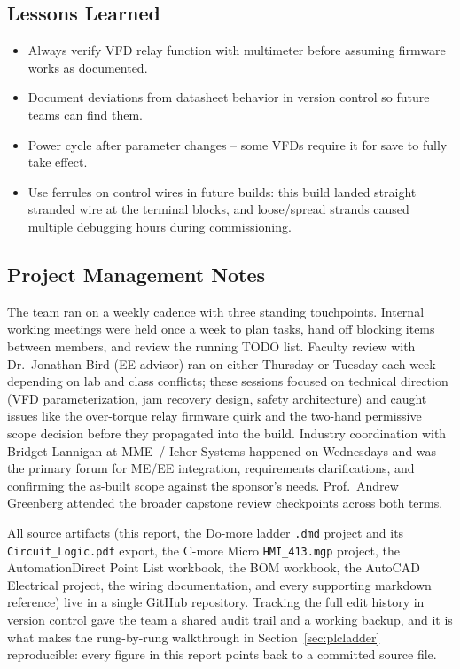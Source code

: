 \documentclass[hidelinks,12pt]{article}
\begin{document}
\subsection{Lessons Learned}
\begin{itemize}
    \item Always verify VFD relay function with multimeter before assuming firmware works as documented.
    \item Document deviations from datasheet behavior in version control so future teams can find them.
    \item Power cycle after parameter changes -- some VFDs require it for save to fully take effect.
    \item Use ferrules on control wires in future builds: this build landed straight stranded wire at the terminal blocks, and loose/spread strands caused multiple debugging hours during commissioning.
\end{itemize}

\subsection{Project Management Notes}

The team ran on a weekly cadence with three standing touchpoints. Internal
working meetings were held once a week to plan tasks, hand off blocking items
between members, and review the running TODO list. Faculty review with
Dr.~Jonathan Bird (EE advisor) ran on either Thursday or Tuesday each week
depending on lab and class conflicts; these sessions focused on technical
direction (VFD parameterization, jam recovery design, safety architecture) and
caught issues like the over-torque relay firmware quirk and the two-hand
permissive scope decision before they propagated into the build. Industry
coordination with Bridget Lannigan at MME~/ Ichor Systems happened on Wednesdays
and was the primary forum for ME/EE integration, requirements clarifications,
and confirming the as-built scope against the sponsor's needs. Prof.~Andrew
Greenberg attended the broader capstone review checkpoints across both terms.

All source artifacts (this report, the Do-more ladder \texttt{.dmd} project and
its \texttt{Circuit\_Logic.pdf} export, the C-more Micro \texttt{HMI\_413.mgp}
project, the AutomationDirect Point List workbook, the BOM workbook, the
AutoCAD Electrical project, the wiring documentation, and every supporting
markdown reference) live in a single GitHub repository. Tracking the full edit
history in version control gave the team a shared audit trail and a working
backup, and it is what makes the rung-by-rung walkthrough in
Section~\ref{sec:plcladder} reproducible: every figure in this report points
back to a committed source file.
\end{document}
